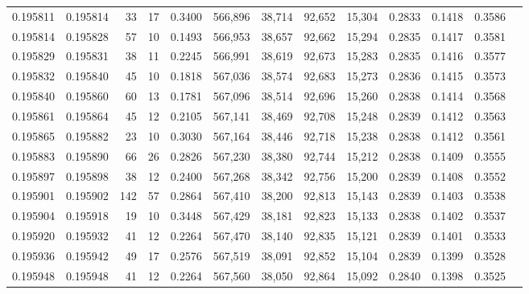 \begin{tabular}{rrrrrrrrrrrrr}
0.195811 & 0.195814 &    33 &  17 &                                     0.3400 & 566,896 &  38,714 &  92,652 &  15,304 & 0.2833 & 0.1418 & 0.3586 \\
0.195814 & 0.195828 &    57 &  10 &                                     0.1493 & 566,953 &  38,657 &  92,662 &  15,294 & 0.2835 & 0.1417 & 0.3581 \\
0.195829 & 0.195831 &    38 &  11 &                                     0.2245 & 566,991 &  38,619 &  92,673 &  15,283 & 0.2835 & 0.1416 & 0.3577 \\
0.195832 & 0.195840 &    45 &  10 &                                     0.1818 & 567,036 &  38,574 &  92,683 &  15,273 & 0.2836 & 0.1415 & 0.3573 \\
0.195840 & 0.195860 &    60 &  13 &                                     0.1781 & 567,096 &  38,514 &  92,696 &  15,260 & 0.2838 & 0.1414 & 0.3568 \\
0.195861 & 0.195864 &    45 &  12 &                                     0.2105 & 567,141 &  38,469 &  92,708 &  15,248 & 0.2839 & 0.1412 & 0.3563 \\
0.195865 & 0.195882 &    23 &  10 &                                     0.3030 & 567,164 &  38,446 &  92,718 &  15,238 & 0.2838 & 0.1412 & 0.3561 \\
0.195883 & 0.195890 &    66 &  26 &                                     0.2826 & 567,230 &  38,380 &  92,744 &  15,212 & 0.2838 & 0.1409 & 0.3555 \\
0.195897 & 0.195898 &    38 &  12 &                                     0.2400 & 567,268 &  38,342 &  92,756 &  15,200 & 0.2839 & 0.1408 & 0.3552 \\
0.195901 & 0.195902 &   142 &  57 &                                     0.2864 & 567,410 &  38,200 &  92,813 &  15,143 & 0.2839 & 0.1403 & 0.3538 \\
0.195904 & 0.195918 &    19 &  10 &                                     0.3448 & 567,429 &  38,181 &  92,823 &  15,133 & 0.2838 & 0.1402 & 0.3537 \\
0.195920 & 0.195932 &    41 &  12 &                                     0.2264 & 567,470 &  38,140 &  92,835 &  15,121 & 0.2839 & 0.1401 & 0.3533 \\
0.195936 & 0.195942 &    49 &  17 &                                     0.2576 & 567,519 &  38,091 &  92,852 &  15,104 & 0.2839 & 0.1399 & 0.3528 \\
0.195948 & 0.195948 &    41 &  12 &                                     0.2264 & 567,560 &  38,050 &  92,864 &  15,092 & 0.2840 & 0.1398 & 0.3525 \\

\end{tabular}
